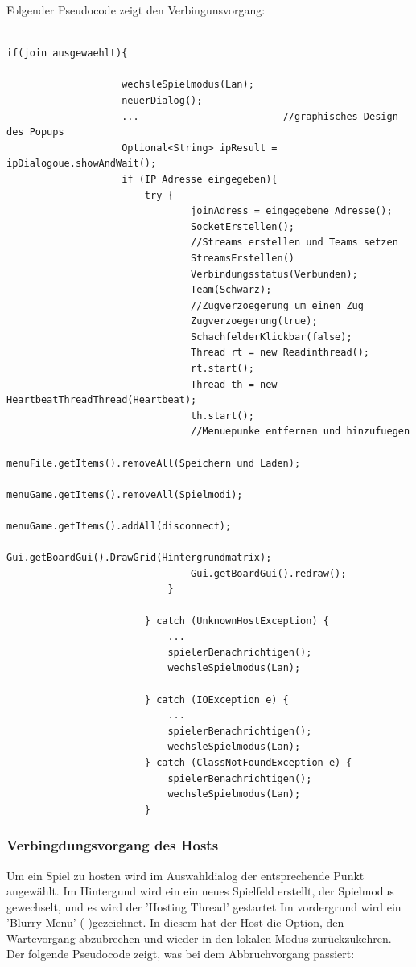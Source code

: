 \documentclass[12pt,a4paper]{article}
\begin{document}
{Folgender Pseudocode zeigt den Verbingunsvorgang: \\
\lstset{language=Java}
\begin{lstlisting}

if(join ausgewaehlt){				

					wechsleSpielmodus(Lan);				
					neuerDialog();
					...							//graphisches Design des Popups
					Optional<String> ipResult = ipDialogoue.showAndWait();
					if (IP Adresse eingegeben){										
						try {
								joinAdress = eingegebene Adresse();
								SocketErstellen();
								//Streams erstellen und Teams setzen	
								StreamsErstellen()
								Verbindungsstatus(Verbunden);
								Team(Schwarz);			
								//Zugverzoegerung um einen Zug		
								Zugverzoegerung(true);
								SchachfelderKlickbar(false);
								Thread rt = new Readinthread();  		
								rt.start();
								Thread th = new HeartbeatThreadThread(Heartbeat);
								th.start();
								//Menuepunke entfernen und hinzufuegen
								menuFile.getItems().removeAll(Speichern und Laden);
								menuGame.getItems().removeAll(Spielmodi);		
								menuGame.getItems().addAll(disconnect);	
								Gui.getBoardGui().DrawGrid(Hintergrundmatrix);		
								Gui.getBoardGui().redraw();
							}

						} catch (UnknownHostException) {
							...
							spielerBenachrichtigen();
							wechsleSpielmodus(Lan);		
							
						} catch (IOException e) {
							...
							spielerBenachrichtigen();
							wechsleSpielmodus(Lan);		
						} catch (ClassNotFoundException e) {
							spielerBenachrichtigen();
							wechsleSpielmodus(Lan);		
						}
\end{lstlisting}

\subsubsection{Verbingdungsvorgang des Hosts}
\label{SUBSUBSEC:CONHOST}

Um ein Spiel zu hosten wird im Auswahldialog der entsprechende Punkt angewählt. 
Im Hintergund wird ein ein neues Spielfeld erstellt, der Spielmodus gewechselt, und es wird der 'Hosting Thread' gestartet %
Im vordergrund wird ein 'Blurry Menu' ( %
)gezeichnet. In diesem hat der Host die Option, den Wartevorgang abzubrechen und wieder in den lokalen Modus zurückzukehren. \\
Der folgende Pseudocode zeigt, was bei dem Abbruchvorgang passiert: 
\lstset{language=java}
\begin{lstlisting}


\end{lstlisting}}
\end{document}
